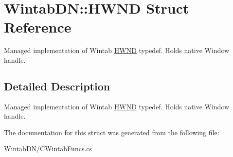 \hypertarget{struct_wintab_d_n_1_1_h_w_n_d}{
\section{WintabDN::HWND Struct Reference}
\label{struct_wintab_d_n_1_1_h_w_n_d}
}


Managed implementation of Wintab \hyperlink{struct_wintab_d_n_1_1_h_w_n_d}{HWND} typedef. Holds native Window handle.  




\subsection{Detailed Description}
Managed implementation of Wintab \hyperlink{struct_wintab_d_n_1_1_h_w_n_d}{HWND} typedef. Holds native Window handle. 

The documentation for this struct was generated from the following file:\begin{DoxyCompactItemize}
\item 
WintabDN/CWintabFuncs.cs\end{DoxyCompactItemize}
